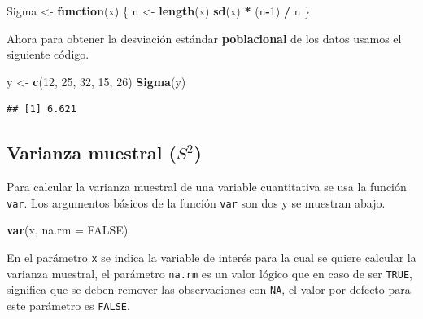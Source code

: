 \documentclass[10pt,]{krantz}
\makeatletter
\newenvironment{Shaded}{\begin{snugshade}}{\end{snugshade}}
\newcommand{\KeywordTok}[1]{\textcolor[rgb]{0.13,0.29,0.53}{\textbf{#1}}}
\newcommand{\DataTypeTok}[1]{\textcolor[rgb]{0.13,0.29,0.53}{#1}}
\newcommand{\DecValTok}[1]{\textcolor[rgb]{0.00,0.00,0.81}{#1}}
\newcommand{\StringTok}[1]{\textcolor[rgb]{0.31,0.60,0.02}{#1}}
\newcommand{\OtherTok}[1]{\textcolor[rgb]{0.56,0.35,0.01}{#1}}
\newcommand{\ControlFlowTok}[1]{\textcolor[rgb]{0.13,0.29,0.53}{\textbf{#1}}}
\newcommand{\OperatorTok}[1]{\textcolor[rgb]{0.81,0.36,0.00}{\textbf{#1}}}
\newcommand{\NormalTok}[1]{#1}
\newenvironment{kframe}{%
\medskip{}
\setlength{\fboxsep}{.8em}
 \def\at@end@of@kframe{}%
 \ifinner\ifhmode%
  \def\at@end@of@kframe{\end{minipage}}%
  \begin{minipage}{\columnwidth}%
 \fi\fi%
 \def\FrameCommand##1{\hskip\@totalleftmargin \hskip-\fboxsep
 \colorbox{shadecolor}{##1}\hskip-\fboxsep
     \hskip-\linewidth \hskip-\@totalleftmargin \hskip\columnwidth}%
 \MakeFramed {\advance\hsize-\width
   \@totalleftmargin\z@ \linewidth\hsize
   \@setminipage}}%
 {\par\unskip\endMakeFramed%
 \at@end@of@kframe}
\renewenvironment{Shaded}{\begin{kframe}}{\end{kframe}}
\makeatother
\begin{document}
\begin{Shaded}
\begin{Highlighting}[]
\NormalTok{Sigma <-}\StringTok{ }\ControlFlowTok{function}\NormalTok{(x) \{}
\NormalTok{  n <-}\StringTok{ }\KeywordTok{length}\NormalTok{(x)}
  \KeywordTok{sd}\NormalTok{(x) }\OperatorTok{*}\StringTok{ }\NormalTok{(n}\OperatorTok{-}\DecValTok{1}\NormalTok{) }\OperatorTok{/}\StringTok{ }\NormalTok{n}
\NormalTok{\} }
\end{Highlighting}
\end{Shaded}

Ahora para obtener la desviación estándar \textbf{poblacional} de los
datos usamos el siguiente código.

\begin{Shaded}
\begin{Highlighting}[]
\NormalTok{y <-}\StringTok{ }\KeywordTok{c}\NormalTok{(}\DecValTok{12}\NormalTok{, }\DecValTok{25}\NormalTok{, }\DecValTok{32}\NormalTok{, }\DecValTok{15}\NormalTok{, }\DecValTok{26}\NormalTok{)}
\KeywordTok{Sigma}\NormalTok{(y)}
\end{Highlighting}
\end{Shaded}

\begin{verbatim}
## [1] 6.621
\end{verbatim}

\subsection{\texorpdfstring{Varianza muestral (\(S^2\)) 
}{Varianza muestral (S\^{}2)  }}\label{varianza-muestral-s2}

Para calcular la varianza muestral de una variable cuantitativa se usa
la función \texttt{var}. Los argumentos básicos de la función
\texttt{var} son dos y se muestran abajo.

\begin{Shaded}
\begin{Highlighting}[]
\KeywordTok{var}\NormalTok{(x, }\DataTypeTok{na.rm =} \OtherTok{FALSE}\NormalTok{)}
\end{Highlighting}
\end{Shaded}

En el parámetro \texttt{x} se indica la variable de interés para la cual
se quiere calcular la varianza muestral, el parámetro \texttt{na.rm} es
un valor lógico que en caso de ser \texttt{TRUE}, significa que se deben
remover las observaciones con \texttt{NA}, el valor por defecto para
este parámetro es \texttt{FALSE}.
\end{document}
